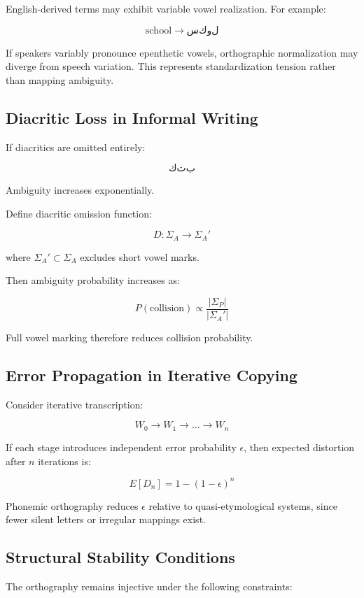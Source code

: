 \documentclass[12pt]{article}
\begin{document}
English-derived terms may exhibit variable vowel realization. For example:

\[
\text{school} \rightarrow سكول
\]

If speakers variably pronounce epenthetic vowels, orthographic normalization may diverge from speech variation. This represents standardization tension rather than mapping ambiguity.

\subsection{Diacritic Loss in Informal Writing}

If diacritics are omitted entirely:

\[
كتب
\]

Ambiguity increases exponentially.

Define diacritic omission function:

\[
D : \Sigma_A \rightarrow \Sigma_A'
\]

where \( \Sigma_A' \subset \Sigma_A \) excludes short vowel marks.

Then ambiguity probability increases as:

\[
P(\text{collision}) \propto \frac{|\Sigma_P|}{|\Sigma_A'|}
\]

Full vowel marking therefore reduces collision probability.

\subsection{Error Propagation in Iterative Copying}

Consider iterative transcription:

\[
W_0 \rightarrow W_1 \rightarrow \dots \rightarrow W_n
\]

If each stage introduces independent error probability \( \epsilon \), then expected distortion after \( n \) iterations is:

\[
E[D_n] = 1 - (1-\epsilon)^n
\]

Phonemic orthography reduces \( \epsilon \) relative to quasi-etymological systems, since fewer silent letters or irregular mappings exist.

\subsection{Structural Stability Conditions}

The orthography remains injective under the following constraints:
\end{document}
